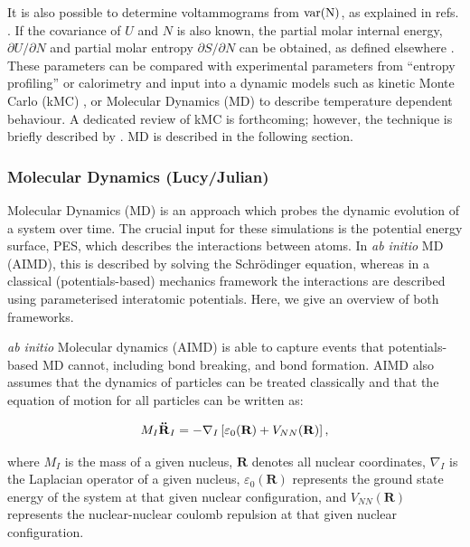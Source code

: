\documentclass[../main.tex]{subfiles}
\begin{document}
It is also possible to determine voltammograms from $\rm{var}(N)$, as explained in refs. \cite{mercer_influence_2017,darling1999}. If the covariance of $U$ and $N$ is also known, the partial molar internal energy, $\partial{U}/\partial{N}$ and partial molar entropy $\partial{S}/\partial{N}$ can be obtained, as defined elsewhere \cite{mercer_influence_2017,Kim2001h}. These parameters can be compared with experimental parameters from ``entropy profiling'' or calorimetry \cite{mercer_influence_2017,schlueter_quantifying_2018, Mercer2019,THOMAS2003844,zhang2017} and input into a dynamic models such as kinetic Monte Carlo (kMC) \cite{gavilan-arriazu_kinetic_2020,darling1999,gavilan-arriazu_effect_2020,persson2010}, or Molecular Dynamics (MD) to describe temperature dependent behaviour. A dedicated review of kMC is forthcoming; however, the technique is briefly described by \citeauthor{VanderVen2020}. \cite{VanderVen2020} MD is described in the following section.

\subsubsection{Molecular Dynamics (Lucy/Julian)}
\label{sec:molecular_dynamics}
Molecular Dynamics (MD) is an approach which probes the dynamic evolution of a system over time. The crucial input for these simulations is the potential energy surface, PES, which describes the interactions between atoms. In \textit{ab initio} MD (AIMD), this is described by solving the Schr\"{o}dinger equation, whereas in a classical (potentials-based) mechanics framework the interactions are described using parameterised interatomic potentials. Here, we give an overview of both frameworks.

\textit{ab initio} Molecular dynamics (AIMD) is able to capture events that potentials-based MD cannot, including bond breaking, and bond formation. AIMD also assumes that the dynamics of particles can be treated classically and that the equation of motion for all particles can be written as:

\begin{equation}
    \label{eq:eom}
    M_I \textrm{\textbf{\"{R}}} _I=-\nabla_I\left[ \varepsilon_0(\textbf{R})+V_{NN}(\mathbf{R})\right],
\end{equation}

where $M_I$ is the mass of a given nucleus, $\textbf{R}$ denotes all nuclear coordinates, $\nabla_I$ is the Laplacian operator of a given nucleus, $\varepsilon_0(\textbf{R})$ represents the ground state energy of the system at that given nuclear configuration, and $V_{NN}(\textbf{R})$ represents the nuclear-nuclear coulomb repulsion at that given nuclear configuration. 
\end{document}

